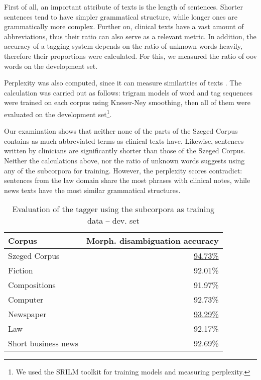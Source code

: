 First of all, an important attribute of texts is the length of sentences. 
Shorter sentences tend to have simpler grammatical structure, while longer ones are grammatically more complex. 
Further on, clinical texts have a vast amount of abbreviations, thus their ratio can also serve as a relevant metric. 
In addition, the accuracy of a tagging system depends on the ratio of unknown words heavily, therefore their proportions were calculated. 
For this, we measured the ratio of \acrshort{oov} words on the development set. 

Perplexity was also computed, since it can measure similarities of texts \cite{kilgarriff1998measures}. 
The calculation was carried out as follows: trigram models of word and tag sequences were trained on each corpus using Kneser-Ney smoothing, then all of them were evaluated on the development set\footnote{We used the SRILM toolkit \cite{stolcke2002srilm} for training models and measuring perplexity.}.

Our examination shows that neither none of the parts of the Szeged Corpus contains as much abbreviated terms as clinical texts have. 
Likewise, sentences written by clinicians are significantly shorter than those of the Szeged Corpus. 
Neither the calculations above, nor the ratio of unknown words suggests using any of the  subcorpora for training. 
However, the perplexity scores contradict: sentences from the law domain share the most phrases with clinical notes, while news texts have the most similar grammatical structures. 

\begin{table}[H]
\centering
\caption{Evaluation of the tagger using the subcorpora as training data -- dev. set}
\label{tab:eval_subcorpora}
\begin{tabular}{ l r } 
\hline
Corpus & Morph. disambiguation accuracy \\
\hline
Szeged Corpus & \underline{94.73\%} \\
\hspace{0.2cm} Fiction & 92.01\% \\
\hspace{0.2cm} Compositions & 91.97\% \\
\hspace{0.2cm} Computer & 92.73\% \\
\hspace{0.2cm} Newspaper & \underline{93.29\%} \\
\hspace{0.2cm} Law & 92.17\% \\
\hspace{0.2cm} Short business news & 92.69\% \\
\hline
\end{tabular}
\end{table}


